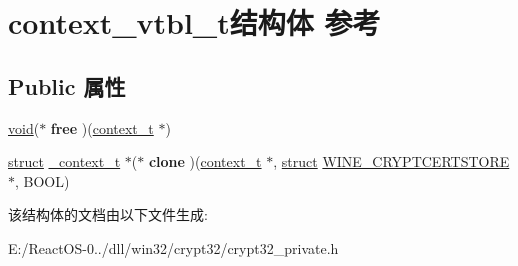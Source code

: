 \hypertarget{structcontext__vtbl__t}{}\section{context\+\_\+vtbl\+\_\+t结构体 参考}
\label{structcontext__vtbl__t}
\subsection*{Public 属性}
\begin{DoxyCompactItemize}
\item 
\mbox{\label{structcontext__vtbl__t_ad05ce7ada6728d8a7e20f2373dc6af64}} 
\hyperlink{interfacevoid}{void}($\ast$ {\bfseries free} )(\hyperlink{struct__context__t}{context\+\_\+t} $\ast$)
\item 
\mbox{\label{structcontext__vtbl__t_a7e83d1a61a6fcf2030f11e8f4f375267}} 
\hyperlink{interfacestruct}{struct} \hyperlink{struct__context__t}{\+\_\+context\+\_\+t} $\ast$($\ast$ {\bfseries clone} )(\hyperlink{struct__context__t}{context\+\_\+t} $\ast$, \hyperlink{interfacestruct}{struct} \hyperlink{struct_w_i_n_e___c_r_y_p_t_c_e_r_t_s_t_o_r_e}{W\+I\+N\+E\+\_\+\+C\+R\+Y\+P\+T\+C\+E\+R\+T\+S\+T\+O\+RE} $\ast$, B\+O\+OL)
\end{DoxyCompactItemize}


该结构体的文档由以下文件生成\+:\begin{DoxyCompactItemize}
\item 
E\+:/\+React\+O\+S-\/0../dll/win32/crypt32/crypt32\+\_\+private.\+h\end{DoxyCompactItemize}

